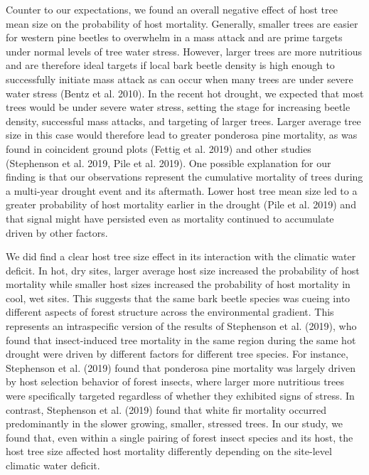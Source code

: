 \documentclass[]{article}
\begin{document}
Counter to our expectations, we found an overall negative effect of host
tree mean size on the probability of host mortality. Generally, smaller
trees are easier for western pine beetles to overwhelm in a mass attack
and are prime targets under normal levels of tree water stress. However,
larger trees are more nutritious and are therefore ideal targets if
local bark beetle density is high enough to successfully initiate mass
attack as can occur when many trees are under severe water stress (Bentz
et al. 2010). In the recent hot drought, we expected that most trees
would be under severe water stress, setting the stage for increasing
beetle density, successful mass attacks, and targeting of larger trees.
Larger average tree size in this case would therefore lead to greater
ponderosa pine mortality, as was found in coincident ground plots
(Fettig et al. 2019) and other studies (Stephenson et al. 2019, Pile et
al. 2019). One possible explanation for our finding is that our
observations represent the cumulative mortality of trees during a
multi-year drought event and its aftermath. Lower host tree mean size
led to a greater probability of host mortality earlier in the drought
(Pile et al. 2019) and that signal might have persisted even as
mortality continued to accumulate driven by other factors.

We did find a clear host tree size effect in its interaction with the
climatic water deficit. In hot, dry sites, larger average host size
increased the probability of host mortality while smaller host sizes
increased the probability of host mortality in cool, wet sites. This
suggests that the same bark beetle species was cueing into different
aspects of forest structure across the environmental gradient. This
represents an intraspecific version of the results of Stephenson et al.
(2019), who found that insect-induced tree mortality in the same region
during the same hot drought were driven by different factors for
different tree species. For instance, Stephenson et al. (2019) found
that ponderosa pine mortality was largely driven by host selection
behavior of forest insects, where larger more nutritious trees were
specifically targeted regardless of whether they exhibited signs of
stress. In contrast, Stephenson et al. (2019) found that white fir
mortality occurred predominantly in the slower growing, smaller,
stressed trees. In our study, we found that, even within a single
pairing of forest insect species and its host, the host tree size
affected host mortality differently depending on the site-level climatic
water deficit.
\end{document}
